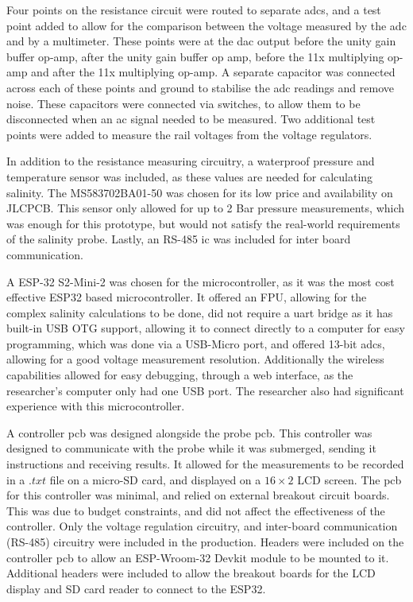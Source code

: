Four points on the resistance circuit were routed to separate \gls{adc}s, and a test point added to allow for the comparison between the voltage measured by the \gls{adc} and by a multimeter.
These points were at the \gls{dac} output before the unity gain buffer op-amp, after the unity gain buffer op amp, before the 11x multiplying op-amp and after the 11x multiplying op-amp.
A separate capacitor was connected across each of these points and ground to stabilise the \gls{adc} readings and remove noise.
These capacitors were connected via switches, to allow them to be disconnected when an \gls{ac} signal needed to be measured.
Two additional test points were added to measure the rail voltages from the voltage regulators.

In addition to the resistance measuring circuitry, a waterproof pressure and temperature sensor was included, as these values are needed for calculating salinity.
The MS583702BA01-50 was chosen for its low price and availability on JLCPCB.
This sensor only allowed for up to 2 Bar pressure measurements, which was enough for this prototype, but would not satisfy the real-world requirements of the salinity probe.
Lastly, an RS-485 \gls{ic} was included for inter board communication.

A ESP-32 S2-Mini-2 was chosen for the microcontroller, as it was the most cost effective ESP32 based microcontroller.
It offered an FPU, allowing for the complex salinity calculations to be done, did not require a \gls{uart} bridge as it has built-in USB OTG support, allowing it to connect directly to a computer for easy programming, which was done via a USB-Micro port, and offered 13-bit \gls{adc}s, allowing for a good voltage measurement resolution.
Additionally the wireless capabilities allowed for easy debugging, through a web interface, as the researcher's computer only had one USB port.
The researcher also had significant experience with this microcontroller.

A controller \gls{pcb} was designed alongside the probe \gls{pcb}.
This controller was designed to communicate with the probe while it was submerged, sending it instructions and receiving results.
It allowed for the measurements to be recorded in a $.txt$ file on a micro-SD card, and displayed on a $16\times2$ LCD screen.
The \gls{pcb} for this controller was minimal, and relied on external breakout circuit boards.
This was due to budget constraints, and did not affect the effectiveness of the controller.
Only the voltage regulation circuitry, and inter-board communication (RS-485) circuitry were included in the production.
Headers were included on the controller \gls{pcb} to allow an ESP-Wroom-32 Devkit module to be mounted to it.
Additional headers were included to allow the breakout boards for the LCD display and SD card reader to connect to the ESP32. 

